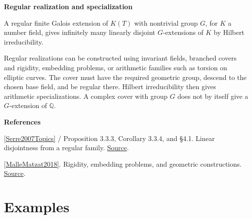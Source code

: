 \documentclass[11pt,a4paper,oneside,openany]{book}
\newenvironment{sources}{\par\smallskip\begingroup\footnotesize\color{atlasgray}\leftskip=10pt\setlength{\parskip}{2pt}}{\par\endgroup\smallskip}
\begin{document}
\begin{atlasblock}[standard]
\textbf{\sffamily Regular realization and specialization}\par\smallskip
\color{black} A regular finite Galois extension of \(K(T)\) with nontrivial group \(G\), for \(K\) a number field, gives infinitely many linearly disjoint \(G\)-extensions of \(K\) by Hilbert irreducibility.\par
\end{atlasblock}\color{black}
\color{black} Regular realizations can be constructed using invariant fields, branched covers and rigidity, embedding problems, or arithmetic families such as torsion on elliptic curves. The cover must have the required geometric group, descend to the chosen base field, and be regular there. Hilbert irreducibility then gives arithmetic specializations. A complex cover with group \(G\) does not by itself give a \(G\)-extension of \(\mathbb Q\).\par
\begin{sources}
\textbf{References}\par\smallskip
\noindent\hyperlink{ref:Serre2007Topics}{[Serre2007Topics]} / Proposition 3.3.3, Corollary 3.3.4, and §4.1. Linear disjointness from a regular family. \href{https://www.routledge.com/Topics-in-Galois-Theory-2nd-Edition/Serre/p/book/9780429064401}{Source}.\par
\noindent\hyperlink{ref:MalleMatzat2018}{[MalleMatzat2018]}. Rigidity, embedding problems, and geometric constructions. \href{https://link.springer.com/book/10.1007/978-3-662-55420-3}{Source}.\par
\end{sources}\color{black}
\section{Examples}
\end{document}
